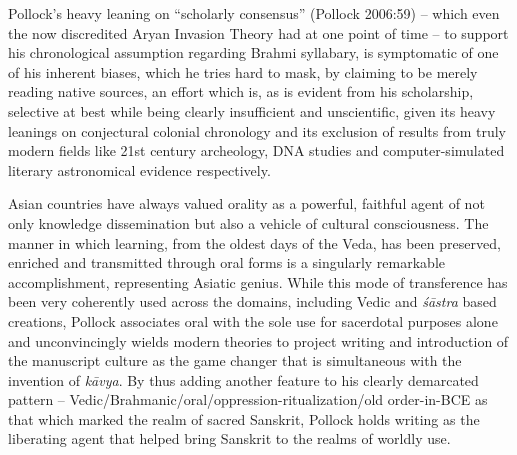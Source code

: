 Pollock’s heavy leaning on “scholarly consensus” (Pollock 2006:59) – which even the now discredited Aryan Invasion Theory had at one point of time – to support his chronological assumption regarding Brahmi syllabary, is symptomatic of one of his inherent biases, which he tries hard to mask, by claiming to be merely reading native sources, an effort which is, as is evident from his scholarship, selective at best while being clearly insufficient and unscientific, given its heavy leanings on conjectural colonial chronology and its exclusion of results from truly modern fields like 21st century archeology, DNA studies and computer-simulated literary astronomical evidence respectively.

Asian countries have always valued orality as a powerful, faithful agent of not only knowledge dissemination but also a vehicle of cultural consciousness. The manner in which learning, from the oldest days of the Veda, has been preserved, enriched and transmitted through oral forms is a singularly remarkable accomplishment, representing Asiatic genius. While this mode of transference has been very coherently used across the domains, including Vedic and \textit{śāstra} based creations, Pollock associates oral with the sole use for sacerdotal purposes alone and unconvincingly wields modern theories to project writing and introduction of the manuscript culture as the game changer that is simultaneous with the invention of \textit{kāvya}. By thus adding another feature to his clearly demarcated pattern – Vedic/Brahmanic/oral/oppression-ritualization/old order-in-BCE as that which marked the realm of sacred Sanskrit, Pollock holds writing as the liberating agent that helped bring Sanskrit to the realms of worldly use.

